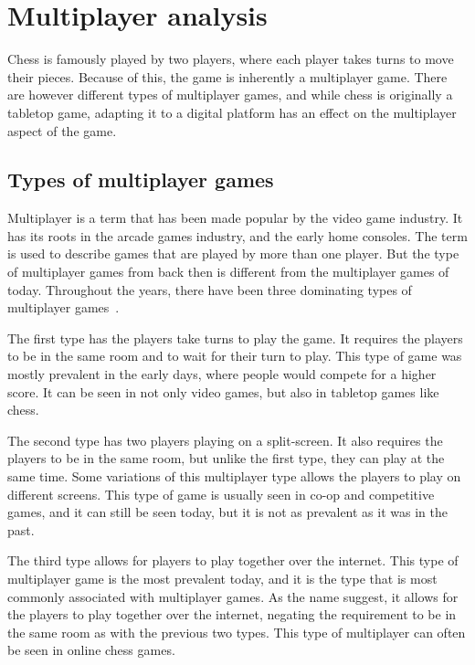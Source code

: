 \section{Multiplayer analysis}\label{sec:multiplayer-analysis}

Chess is famously played by two players, where each player takes turns to move their pieces.
Because of this, the game is inherently a multiplayer game.
There are however different types of multiplayer games, and while chess is originally a tabletop game, adapting it to a
digital platform has an effect on the multiplayer aspect of the game.

\subsection{Types of multiplayer games}\label{subsec:types-of-multiplayer-games}

Multiplayer is a term that has been made popular by the video game industry.
It has its roots in the arcade games industry, and the early home consoles.
The term is used to describe games that are played by more than one player.
But the type of multiplayer games from back then is different from the multiplayer games of today.
Throughout the years, there have been three dominating types of multiplayer games~\cite{multiplayer-types}.

The first type has the players take turns to play the game.
It requires the players to be in the same room and to wait for their turn to play.
This type of game was mostly prevalent in the early days, where people would compete for a higher score.
It can be seen in not only video games, but also in tabletop games like chess.

The second type has two players playing on a split-screen.
It also requires the players to be in the same room, but unlike the first type, they can play at the same time.
Some variations of this multiplayer type allows the players to play on different screens.
This type of game is usually seen in co-op and competitive games, and it can still be seen today, but it is not as
prevalent as it was in the past.

The third type allows for players to play together over the internet.
This type of multiplayer game is the most prevalent today, and it is the type that is most commonly associated with
multiplayer games.
As the name suggest, it allows for the players to play together over the internet, negating the requirement to be in the
same room as with the previous two types.
This type of multiplayer can often be seen in online chess games.


